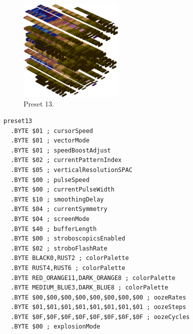 \begin{minipage}[b]{0.48\linewidth}
\begin{figure}[H]                                                          
  \centering                                                             
  \begin{adjustbox}{width=5cm,center}                                   
  \includegraphics[width=5cm]{src/colorspace_presets/preset13-45.png}%
  \end{adjustbox}                                                        
\caption*{Preset 13.}                                           
\end{figure}                                                               
\end{minipage}
\hspace{0.1cm}
\begin{minipage}[b]{0.48\linewidth}                                       
\begin{lstlisting}[basicstyle=\ttfamily\tiny]
preset13
  .BYTE $01 ; cursorSpeed
  .BYTE $01 ; vectorMode
  .BYTE $01 ; speedBoostAdjust
  .BYTE $02 ; currentPatternIndex
  .BYTE $05 ; verticalResolutionSPAC
  .BYTE $00 ; pulseSpeed
  .BYTE $00 ; currentPulseWidth
  .BYTE $10 ; smoothingDelay
  .BYTE $04 ; currentSymmetry
  .BYTE $04 ; screenMode
  .BYTE $40 ; bufferLength
  .BYTE $00 ; stroboscopicsEnabled
  .BYTE $02 ; stroboFlashRate
  .BYTE BLACK0,RUST2 ; colorPalette
  .BYTE RUST4,RUST6 ; colorPalette
  .BYTE RED_ORANGE11,DARK_ORANGE8 ; colorPalette
  .BYTE MEDIUM_BLUE3,DARK_BLUE8 ; colorPalette
  .BYTE $00,$00,$00,$00,$00,$00,$00,$00 ; oozeRates
  .BYTE $01,$01,$01,$01,$01,$01,$01,$01 ; oozeSteps
  .BYTE $0F,$0F,$0F,$0F,$0F,$0F,$0F,$0F ; oozeCycles
  .BYTE $00 ; explosionMode
\end{lstlisting}
\end{minipage}

